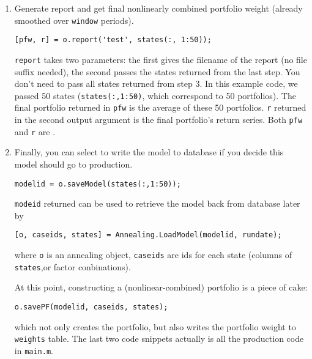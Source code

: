 \documentclass[10pt,oneside,a4paper]{article}
\newcommand\myfints{\mcode{myfints}}
\begin{document}
\begin{enumerate}
  \item Generate report and get final nonlinearly combined portfolio weight (already smoothed over \texttt{window} periods).

\begin{lstlisting}[firstnumber=last]
	[pfw, r] = o.report('test', states(:, 1:50)); 
\end{lstlisting}

   \texttt{report} takes two parameters: the first gives the filename of the report (no file suffix needed),
   the second passes the states returned from the last step.
   You don't need to pass all states returned from step 3. 
   In this example code, we passed 50 states (\texttt{states(:,1:50)}, which correspond to 50 portfolios).
   The final portfolio returned in \texttt{pfw} is the average of these 50 portfolios.
	\texttt{r} returned in the second output argument is the final portfolio's return series.
   Both \texttt{pfw} and \texttt{r} are \myfints.

  \item Finally, you can select to write the model to database if you decide this model should go to production.

\begin{lstlisting}[numbers=none]
    modelid = o.saveModel(states(:,1:50));
\end{lstlisting}

    \texttt{modeid} returned can be used to retrieve the model back from database later by
\begin{lstlisting}[numbers=none]
    [o, caseids, states] = Annealing.LoadModel(modelid, rundate);
\end{lstlisting}
where \texttt{o} is an annealing object, \texttt{caseids} are ids for each state (columns of \texttt{states},or factor conbinations).

At this point, constructing a (nonlinear-combined) portfolio is a piece of cake:
\begin{lstlisting}[numbers=none]
    o.savePF(modelid, caseids, states);
\end{lstlisting}
which not only creates the portfolio, but also writes the portfolio weight to \texttt{weights} table.
The last two code snippets actually is all the production code in \texttt{main.m}.

\end{enumerate}
\end{document}
